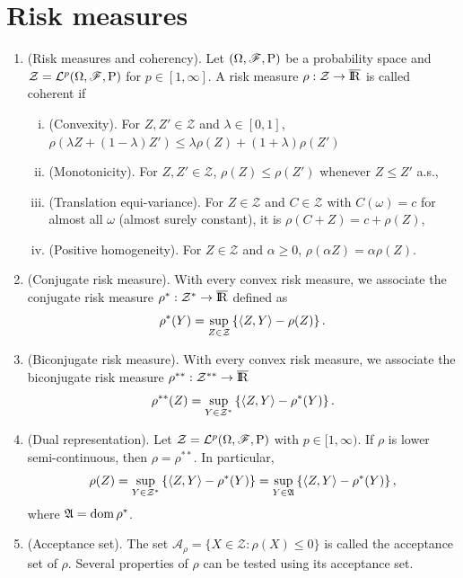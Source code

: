 \documentclass[a4paper,10pt]{scrbook}
\begin{document}
\section{Risk measures}
\begin{enumerate}
 \item (Risk measures and coherency). Let $(\Omega,\mathscr{F},\mathrm{P})$ be a probability space and 
       $\mathcal{Z}=\mathcal{L}^p(\Omega,\mathscr{F},\mathrm{P})$ for $p\in[1,\infty]$. A risk measure 
       $\rho:\mathcal{Z}\to\barre$ is called coherent if
       \begin{enumerate}[i.]
        \item (Convexity). For $Z,Z'\in\mathcal{Z}$ and $\lambda\in[0,1]$, $\rho(\lambda Z + (1-\lambda)Z') 
              \leq \lambda \rho(Z) + (1+\lambda) \rho(Z')$
        \item (Monotonicity). For $Z,Z'\in\mathcal{Z}$, $\rho(Z)\leq \rho(Z')$ whenever $Z\leq Z'$ a.s.,
        \item (Translation equi-variance). For $Z\in\mathcal{Z}$ and $C\in \mathcal{Z}$ with $C(\omega)=c$
              for almost all $\omega$ (almost surely constant), it is $\rho(C+Z) = c + \rho(Z)$,
        \item (Positive homogeneity). For $Z\in\mathcal{Z}$ and $\alpha \geq 0$, $\rho(\alpha Z) = \alpha \rho(Z)$.
       \end{enumerate}   
 \item (Conjugate risk measure). With every convex risk measure, we associate the conjugate risk measure 
       $\rho^*:\mathcal{Z}^*\to\barre$ defined as
       \[
        \rho^*(Y) = \sup_{Z\in\mathcal{Z}} \left\{\langle Z,Y\rangle - \rho(Z) \right\}.
       \]
 \item (Biconjugate risk measure). With every convex risk measure,  we associate the biconjugate risk measure        
       $\rho^{**}:\mathcal{Z}^{**}\to\barre$
       \[
        \rho^{**}(Z) = \sup_{Y\in\mathcal{Z}^*} \left\{\langle Z,Y\rangle - \rho^{*}(Y) \right\}.
       \]
 \item (Dual representation). Let $\mathcal{Z}=\mathcal{L}^p(\Omega,\mathscr{F},\mathrm{P})$ with $p\in[1,\infty)$.
       If $\rho$ is lower semi-continuous, then $\rho = \rho^{**}$. In particular,
       \[
        \rho(Z) = \sup_{Y\in\mathcal{Z}^*} \left\{\langle Z,Y\rangle - \rho^{*}(Y) \right\} 
                = \sup_{Y\in\mathfrak{A}} \left\{\langle Z,Y\rangle - \rho^{*}(Y) \right\},
       \]
       where $\mathfrak{A} = \operatorname{dom} \rho^*$.
       
 \item (Acceptance set). The set $\mathcal{A}_\rho = \{X\in\mathcal{Z} : \rho(X)\leq 0\}$ is called the acceptance 
       set of $\rho$. Several properties of $\rho$ can be tested using its acceptance set.
       

\end{enumerate}
\end{document}
